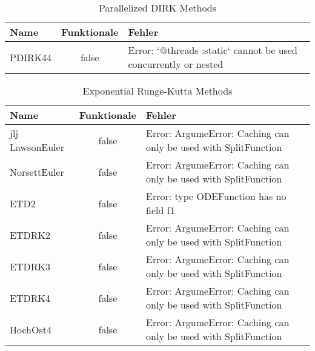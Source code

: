 \begin{table}[H]
    \centering

    \begin{tabular}{p{5cm}|c|p{5cm}}
        Name & Funktionale & Fehler \\
        \hline\hline
        PDIRK44 & false & Error: `@threads :static` cannot be used concurrently or nested \\     
    \end{tabular}
    \caption{Parallelized DIRK Methods}
    \label{tab:my_label}
\end{table}

\begin{table}[H]
    \centering

    \begin{tabular}{p{5cm}|c|p{5cm}}
        Name & Funktionale & Fehler \\
        \hline\hline
jlj        LawsonEuler  & false & Error: ArgumeError: Caching can only be used with SplitFunction \\
        NorsettEuler & false & Error: ArgumeError: Caching can only be used with SplitFunction \\
        ETD2         & false & Error: type ODEFunction has no field f1 \\
        ETDRK2       & false & Error: ArgumeError: Caching can only be used with SplitFunction \\
        ETDRK3       & false & Error: ArgumeError: Caching can only be used with SplitFunction \\
        ETDRK4       & false & Error: ArgumeError: Caching can only be used with SplitFunction \\
        HochOst4     & false & Error: ArgumeError: Caching can only be used with SplitFunction \\
    \end{tabular}
    \caption{Exponential Runge-Kutta Methods}
    \label{tab:my_label}
\end{table}

